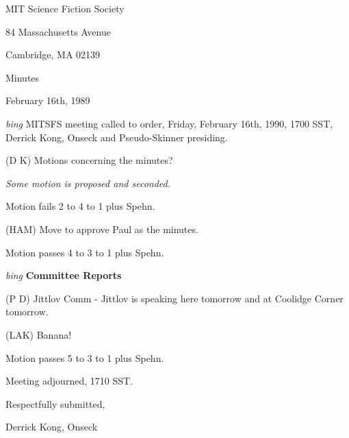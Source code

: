 \setlength{\topmargin}{-0.5in}
\setlength{\oddsidemargin}{0.0in}
\setlength{\evensidemargin}{0.0in}
\setlength{\textheight}{9in}
\setlength{\textwidth}{6.5in}



\begin{center}
MIT Science Fiction Society

84 Massachusetts Avenue

Cambridge, MA 02139

\vspace{0.2in}
Minutes

February 16th, 1989

\end{center}
 
\vspace{0.15in}
{\em bing\/}  MITSFS meeting called to order, Friday, February 16th, 1990,
1700 SST, Derrick Kong, Onseck and Pseudo-Skinner presiding.

(D K) Motions concerning the minutes?

{\em Some motion is proposed and seconded.}

Motion fails 2 to 4 to 1 plus Spehn.

(HAM) Move to approve Paul as the minutes.

Motion passes 4 to 3 to 1 plus Spehn.

\vspace{0.15in}
{\em bing\/} {\bf Committee Reports}

(P D) Jittlov Comm - Jittlov is speaking here tomorrow and at Coolidge
Corner tomorrow.

(LAK) Banana!

Motion passes 5 to 3 to 1 plus Spehn.

Meeting adjourned, 1710 SST.

\vspace{0.15in}
\begin{center}
Respectfully submitted,

Derrick Kong, Onseck
\end{center}

